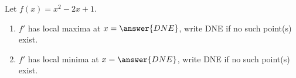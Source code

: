 \documentclass{ximera}
\author{Gregory Hartman \and Matthew Carr}
\begin{document}
\begin{exercise}






Let $f(x)=x^2-2x+1$.
\begin{enumerate}
\item		$f'$ has local maxima at $x=\answer{DNE}$, write DNE if no such point(s) exist.
\item		$f'$ has local minima at $x=\answer{DNE}$, write DNE if no such point(s) exist.
\end{enumerate}

\end{exercise}
\end{document}
